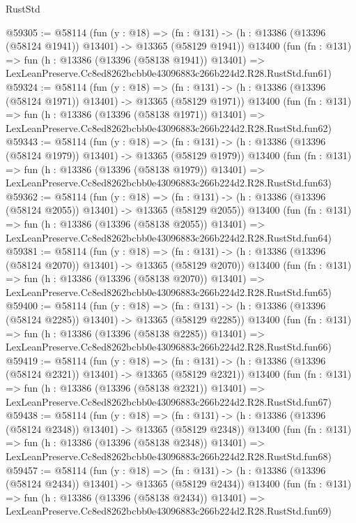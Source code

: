 \begin{lexlean}{RustStd}
\begin{coremodule}
@59305 := @58114
    (fun (y : @18) =>
    (fn : @131) -> (h : @13386 (@13396 (@58124 @1941)) @13401) -> @13365 (@58129 @1941))
    @13400
    (fun (fn : @131) =>
    fun (h : @13386 (@13396 (@58138 @1941)) @13401) =>
    LexLeanPreserve.Cc8ed8262bcbb0e43096883c266b224d2.R28.RustStd.fun61)
@59324 := @58114
    (fun (y : @18) =>
    (fn : @131) -> (h : @13386 (@13396 (@58124 @1971)) @13401) -> @13365 (@58129 @1971))
    @13400
    (fun (fn : @131) =>
    fun (h : @13386 (@13396 (@58138 @1971)) @13401) =>
    LexLeanPreserve.Cc8ed8262bcbb0e43096883c266b224d2.R28.RustStd.fun62)
@59343 := @58114
    (fun (y : @18) =>
    (fn : @131) -> (h : @13386 (@13396 (@58124 @1979)) @13401) -> @13365 (@58129 @1979))
    @13400
    (fun (fn : @131) =>
    fun (h : @13386 (@13396 (@58138 @1979)) @13401) =>
    LexLeanPreserve.Cc8ed8262bcbb0e43096883c266b224d2.R28.RustStd.fun63)
@59362 := @58114
    (fun (y : @18) =>
    (fn : @131) -> (h : @13386 (@13396 (@58124 @2055)) @13401) -> @13365 (@58129 @2055))
    @13400
    (fun (fn : @131) =>
    fun (h : @13386 (@13396 (@58138 @2055)) @13401) =>
    LexLeanPreserve.Cc8ed8262bcbb0e43096883c266b224d2.R28.RustStd.fun64)
@59381 := @58114
    (fun (y : @18) =>
    (fn : @131) -> (h : @13386 (@13396 (@58124 @2070)) @13401) -> @13365 (@58129 @2070))
    @13400
    (fun (fn : @131) =>
    fun (h : @13386 (@13396 (@58138 @2070)) @13401) =>
    LexLeanPreserve.Cc8ed8262bcbb0e43096883c266b224d2.R28.RustStd.fun65)
@59400 := @58114
    (fun (y : @18) =>
    (fn : @131) -> (h : @13386 (@13396 (@58124 @2285)) @13401) -> @13365 (@58129 @2285))
    @13400
    (fun (fn : @131) =>
    fun (h : @13386 (@13396 (@58138 @2285)) @13401) =>
    LexLeanPreserve.Cc8ed8262bcbb0e43096883c266b224d2.R28.RustStd.fun66)
@59419 := @58114
    (fun (y : @18) =>
    (fn : @131) -> (h : @13386 (@13396 (@58124 @2321)) @13401) -> @13365 (@58129 @2321))
    @13400
    (fun (fn : @131) =>
    fun (h : @13386 (@13396 (@58138 @2321)) @13401) =>
    LexLeanPreserve.Cc8ed8262bcbb0e43096883c266b224d2.R28.RustStd.fun67)
@59438 := @58114
    (fun (y : @18) =>
    (fn : @131) -> (h : @13386 (@13396 (@58124 @2348)) @13401) -> @13365 (@58129 @2348))
    @13400
    (fun (fn : @131) =>
    fun (h : @13386 (@13396 (@58138 @2348)) @13401) =>
    LexLeanPreserve.Cc8ed8262bcbb0e43096883c266b224d2.R28.RustStd.fun68)
@59457 := @58114
    (fun (y : @18) =>
    (fn : @131) -> (h : @13386 (@13396 (@58124 @2434)) @13401) -> @13365 (@58129 @2434))
    @13400
    (fun (fn : @131) =>
    fun (h : @13386 (@13396 (@58138 @2434)) @13401) =>
    LexLeanPreserve.Cc8ed8262bcbb0e43096883c266b224d2.R28.RustStd.fun69)

\end{coremodule}
\end{lexlean}
